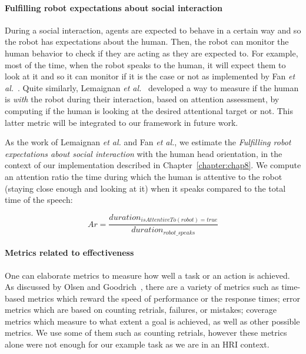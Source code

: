 \documentclass[a4paper,11pt,twoside]{StyleThese}
\begin{document}
\paragraph{Fulfilling robot expectations about social interaction}\label{subsubsec:r_exp}
During a social interaction, agents are expected to behave in a certain way and so the robot has expectations about the human. Then, the robot can monitor the human behavior to check if they are acting as they are expected to. For example, most of the time, when the robot speaks to the human, it will expect them to look at it and so it can monitor if it is the case or not as implemented by Fan \textit{et al.}~\cite{fan2017}. Quite similarly, Lemaignan \textit{et al.}~\cite{lemaignan2016} developed a way to measure if the human is \textit{with} the robot during their interaction, based on attention assessment, by computing if the human is looking at the desired attentional target or not. This latter metric will be integrated to our framework in future work.

As the work of Lemaignan \textit{et al.} and Fan \textit{et al.}, we estimate the \textit{Fulfilling robot expectations about social interaction} with the human head orientation, in the context of our implementation described in Chapter~\ref{chapter:chap8}. We compute an attention ratio \ie the time during which the human is attentive to the robot (\ie staying close enough and looking at it) when it speaks compared to the total time of the speech:

\begin{equation}\label{eq:attention_r}
Ar = \frac{duration_{isAttentiveTo(robot)=true}}{duration_{robot\_speaks}}
\end{equation}

\paragraph{Metrics related to effectiveness}\label{subsec:task_eff}
One can elaborate metrics to measure how well a task or an action is achieved. As discussed by Olsen and Goodrich~\cite{olsen_2003_metrics}, there are a variety of metrics such as time-based metrics which reward the speed of performance or the response times; error metrics which are based on counting retrials, failures, or mistakes; coverage metrics which measure to what extent a goal is achieved, as well as other possible metrics. We use some of them such as counting retrials, however these metrics alone were not enough for our example task as we are in an HRI context.
\end{document}
